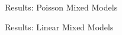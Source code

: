 \begin{frame}{Results: Poisson Mixed Models}
   
\end{frame}

\begin{frame}{Results: Linear Mixed Models}
	
\end{frame}